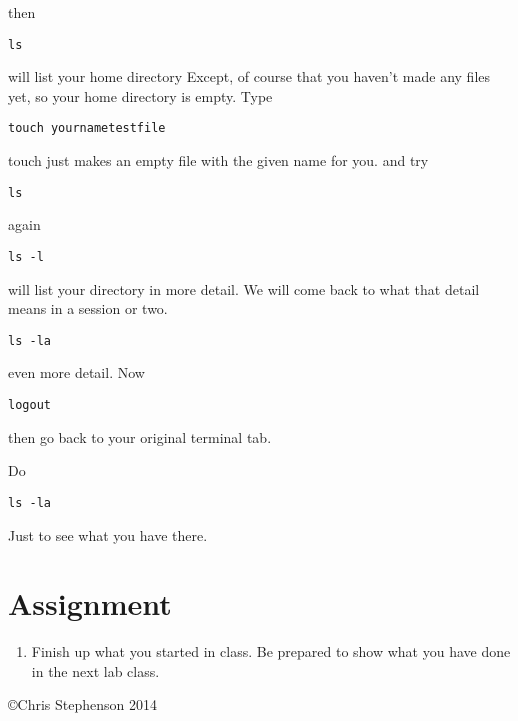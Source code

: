 \documentclass[12pt,a4paper]{article}
\begin{document}
then
\begin{verbatim}
ls
\end{verbatim}
will list your home directory
Except, of course that you haven’t made any files yet, so your home directory is empty. 
Type
\begin{verbatim}
touch yournametestfile
\end{verbatim}
touch just makes an empty file with the given name for you.
and try
\begin{verbatim}
ls
\end{verbatim}
again
\begin{verbatim}
ls -l
\end{verbatim}
will list your directory in more detail. We will come back to what that detail means in a session or two. 
\begin{verbatim}
ls -la
\end{verbatim}
even more detail. Now 
\begin{verbatim}
logout
\end{verbatim}

then go back to your original terminal tab.

Do 
\begin{verbatim}
ls -la
\end{verbatim}
Just to see what you have there.


\section*{Assignment}


\begin{enumerate}
\item Finish up what you started in class. Be prepared to show what you have done in the next lab class. 


\end{enumerate}

\copyright Chris Stephenson 2014
\end{document}

